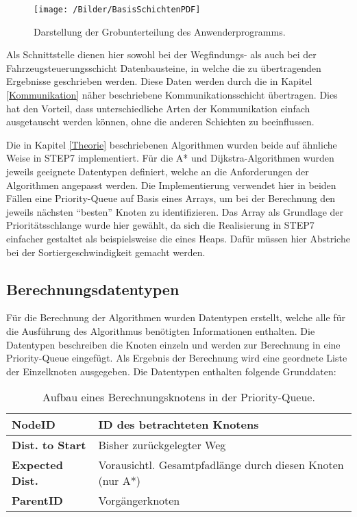 		\begin{wrapfigure}{r}{5cm}
			\centering
			\texttt{[image: /Bilder/BasisSchichtenPDF]}
			\vspace{0.2cm}
			\caption{Darstellung der Grobunterteilung des Anwenderprogramms.}
		\end{wrapfigure}
		
		 Als Schnittstelle dienen hier sowohl bei der Wegfindungs- als auch bei der Fahrzeugsteuerungsschicht  Datenbausteine, in welche die zu übertragenden Ergebnisse geschrieben werden. Diese Daten werden durch die in Kapitel \ref{Kommunikation} näher beschriebene Kommunikationsschicht übertragen. Dies hat den Vorteil, dass unterschiedliche Arten der Kommunikation einfach ausgetauscht werden können, ohne die anderen Schichten zu beeinflussen.
		
		Die in Kapitel \ref{Theorie} beschriebenen Algorithmen wurden beide auf ähnliche Weise in \ac{STEP7} implementiert. Für die A* und Dijkstra-Algorithmen wurden jeweils geeignete Datentypen definiert, welche an die Anforderungen der Algorithmen angepasst werden. Die Implementierung verwendet hier in beiden Fällen eine Priority-Queue auf Basis eines Arrays, um bei der Berechnung den jeweils nächsten "`besten"' Knoten zu identifizieren. Das Array als Grundlage der Prioritätsschlange wurde hier gewählt, da sich die Realisierung in \ac{STEP7} einfacher gestaltet als beispielsweise die eines Heaps. Dafür müssen hier Abstriche bei der Sortiergeschwindigkeit gemacht werden.
		
		\subsection{Berechnungsdatentypen}
			\label{Datentypen_Berechnung}
			Für die Berechnung der Algorithmen wurden Datentypen erstellt, welche alle für die Ausführung des Algorithmus benötigten Informationen enthalten. Die Datentypen beschreiben die Knoten einzeln und werden zur Berechnung in eine Priority-Queue eingefügt. Als Ergebnis der Berechnung wird eine geordnete Liste der Einzelknoten ausgegeben. Die Datentypen enthalten folgende Grunddaten:
			\\
			\begin{table}[H]
				\begin{tabular}{| l | l |}
					\hline
					\textbf{NodeID} & ID des betrachteten Knotens\\ \hline
					\textbf{Dist. to Start} & Bisher zurückgelegter Weg\\ \hline
					\textbf{Expected Dist.} & Vorausichtl. Gesamtpfadlänge durch diesen Knoten (nur A*)\\ \hline
					\textbf{ParentID} & Vorgängerknoten\\
					\hline
				\end{tabular}
				\vspace{0.2cm}
				\caption{Aufbau eines Berechnungsknotens in der Priority-Queue.}
			\end{table}
			
